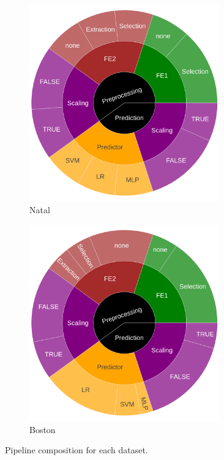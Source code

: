 \begin{figure}
  	\begin{subfigure}[t]{0.3\textwidth}
    \centering\includegraphics[width=0.9\textwidth]{img/sunburst/natal.png}
    \caption{Natal}
  	\end{subfigure}
	\begin{subfigure}[t]{0.3\textwidth}
    \centering\includegraphics[width=0.9\textwidth]{img/sunburst/boston.png}
    \caption{Boston}
  	\end{subfigure}

    \caption{Pipeline composition for each dataset.}
    \label{fig:dataset_composition}
\end{figure}